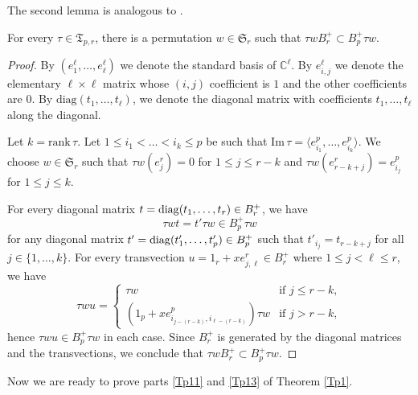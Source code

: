 \documentclass[ALCO,Unicode]{cedram}
\newcommand{\rank}{\mathrm{rank}}
\newcommand{\Span}[1]{\langle #1\rangle}
\newcommand{\permutationsof}[1]{\mathfrak{S}_{#1}}
\newcommand{\ppermutationsof}{\mathfrak{T}}
\newcommand{\mC}{\mathbb{C}}
\newcommand{\diag}{\qopname\relax o{diag}}
\begin{document}
The second lemma is analogous to \cite[Lemma 8.2]{FN2}.

\begin{lemma}
\label{L3.3}
For every $\tau\in\ppermutationsof_{p,r}$, there is a permutation $w\in\permutationsof{r}$
such that $\tau w B_r^+\subset B_p^+\tau w$.
\end{lemma}

\begin{proof}
By $(e_1^\ell,\ldots,e_\ell^\ell)$ we denote the standard basis of $\mC^\ell$. By $e_{i,j}^\ell$ we denote the elementary $\ell\times \ell$ matrix
whose $(i,j)$ coefficient is $1$ and the other coefficients are $0$. By $\mathrm{diag}(t_1,\ldots,t_\ell)$, we denote the diagonal matrix with coefficients $t_1,\ldots,t_\ell$ along the diagonal.

Let $k=\rank\,\tau$. Let $1\leq i_1<\ldots<i_k\leq p$ be such that $\mathrm{Im}\,\tau=\Span{e_{i_1}^p,\ldots,e_{i_k}^p}$.
We choose $w\in\permutationsof{r}$ such that $\tau w(e_j^r)=0$ for $1\leq j\leq r-k$ and $\tau w(e_{r-k+j}^r)=e_{i_j}^p$
for $1\leq j\leq k$.

For every diagonal matrix $t=\diag(t_1,\ldots,t_r)\in B_r^+$, we have
\[\tau w t=t'\tau w\in B_p^+\tau w\]
for any diagonal matrix $t'=\diag(t'_1,\ldots,t'_p)\in B_p^+$ such that $t'_{i_j}=t_{r-k+j}$ for all $j\in\{1,\ldots,k\}$.
For every transvection $u=1_r+xe_{j,\ell}^r\in B_r^+$ where $1\leq j<\ell\leq r$, we have
\[
\tau w u=\left\{\begin{array}{ll}
\tau w & \mbox{if $j\leq r-k$},\\
(1_p+xe_{i_{j-(r-k)},i_{\ell-(r-k)}}^p)\tau w & \mbox{if $j>r-k$},
\end{array}\right.
\]
hence $\tau wu\in B_p^+\tau w$ in each case. Since $B_r^+$ is generated by the diagonal matrices and the transvections, we conclude that $\tau w B_r^+\subset B_p^+\tau w$.
\end{proof}

Now we are ready to prove parts \ref{Tp11} and \ref{Tp13} of Theorem \ref{Tp1}.
\end{document}
